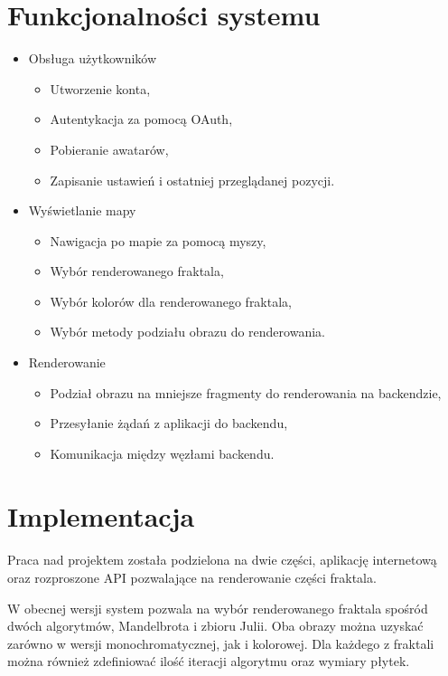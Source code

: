 \documentclass[wide,a4paper,titlepage,12pt]{article}
\begin{document}
\newpage
\section{Funkcjonalności systemu}

\begin{itemize}
  \item Obsługa użytkowników
    \begin{itemize}
      \item Utworzenie konta,
      \item Autentykacja za pomocą OAuth,
      \item Pobieranie awatarów,
      \item Zapisanie ustawień i ostatniej przeglądanej pozycji.
    \end{itemize}
  \item Wyświetlanie mapy
    \begin{itemize}
      \item Nawigacja po mapie za pomocą myszy,
      \item Wybór renderowanego fraktala,
      \item Wybór kolorów dla renderowanego fraktala,
      \item Wybór metody podziału obrazu do renderowania.
    \end{itemize}
  \item Renderowanie
    \begin{itemize}
      \item Podział obrazu na mniejsze fragmenty do renderowania na backendzie,
      \item Przesyłanie żądań z aplikacji do backendu,
      \item Komunikacja między węzłami backendu.
    \end{itemize}
\end{itemize}

\section{Implementacja}
\paragraph{}
Praca nad projektem została podzielona na dwie części, aplikację internetową
oraz rozproszone API pozwalające na renderowanie części fraktala.

W obecnej wersji system pozwala na wybór renderowanego fraktala spośród dwóch algorytmów,
Mandelbrota i zbioru Julii. Oba obrazy można uzyskać zarówno w wersji monochromatycznej, 
jak i kolorowej. Dla każdego z fraktali można również zdefiniować ilość iteracji algorytmu oraz
wymiary płytek. 
\end{document}
